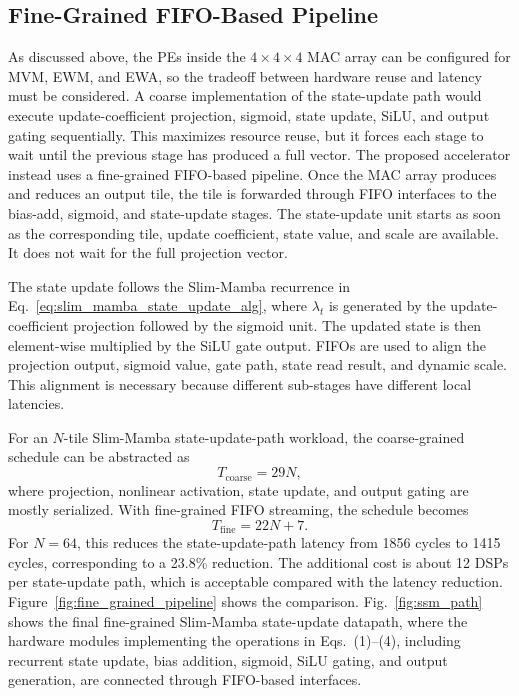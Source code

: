 \documentclass[lettersize,journal]{IEEEtran}
\begin{document}
\subsection{Fine-Grained FIFO-Based Pipeline}

As discussed above, the PEs inside the $4\times4\times4$ MAC array can be configured
for MVM, EWM, and EWA, so the tradeoff between hardware reuse and latency must be considered.
A coarse implementation of the state-update path would execute update-coefficient projection,
sigmoid, state update, SiLU, and output gating sequentially. This maximizes
resource reuse, but it forces each stage to wait until the previous stage has
produced a full vector. The proposed accelerator instead uses a fine-grained
FIFO-based pipeline. Once the MAC array produces and reduces an output tile,
the tile is forwarded through FIFO interfaces to the bias-add, sigmoid, and
state-update stages. The state-update unit starts as soon as the corresponding
tile, update coefficient, state value, and scale are available. It does not wait
for the full projection vector.

The state update follows the Slim-Mamba recurrence
in
Eq.~\eqref{eq:slim_mamba_state_update_alg}, where $\lambda_t$ is generated by the
update-coefficient projection followed by the sigmoid unit. The updated state is then
element-wise multiplied by the SiLU gate output. FIFOs are
used to align the projection output, sigmoid value, gate path, state read result,
and dynamic scale. This alignment is necessary because different sub-stages have
different local latencies.

For an $N$-tile Slim-Mamba state-update-path workload, the coarse-grained schedule can be abstracted as
\begin{equation}
T_{\mathrm{coarse}} = 29N ,
\label{eq:coarse_latency}
\end{equation}
where projection, nonlinear activation, state update, and output gating are
mostly serialized. With fine-grained FIFO streaming, the schedule becomes
\begin{equation}
T_{\mathrm{fine}} = 22N + 7 .
\label{eq:fine_latency}
\end{equation}
For $N=64$, this reduces the state-update-path latency from 1856 cycles to 1415 cycles,
corresponding to a 23.8\% reduction. The additional cost is about 12 DSPs per
state-update path, which is acceptable compared with the latency reduction.
Figure~\ref{fig:fine_grained_pipeline} shows the comparison. Fig.~\ref{fig:ssm_path}
shows the final fine-grained Slim-Mamba state-update datapath, where the hardware modules implementing the operations in Eqs.~(1)--(4), including recurrent state update, bias addition, sigmoid, SiLU gating, and output generation, are connected through FIFO-based interfaces.
\end{document}
